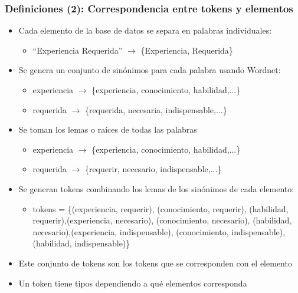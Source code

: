 \fontsize{9.5pt}{7.2}\selectfont
\begin{frame}
  \frametitle{Definiciones (2): Correspondencia entre tokens y elementos}
  \begin{itemize}
    \item Cada elemento de la base de datos se separa en palabras individuales:
    \begin{itemize}\fontsize{9.5pt}{7.2}\selectfont
      \item “Experiencia Requerida” $\rightarrow$ \{Experiencia, Requerida\}
    \end{itemize}
    \item Se genera un conjunto de sinónimos para cada palabra usando Wordnet:
    \begin{itemize}\fontsize{9.5pt}{7.2}\selectfont
      \item experiencia $\rightarrow$ \{experiencia, conocimiento, habilidad,...\}
      \item requerida $\rightarrow$ \{requerida, necesaria, indispensable,...\}
    \end{itemize}
    \item Se toman los lemas o raíces de todas las palabras
      \begin{itemize}\fontsize{9.5pt}{7.2}\selectfont
        \item experiencia $\rightarrow$ \{experiencia, conocimiento, habilidad,...\}
        \item requerida $\rightarrow$ \{requerir, necesario, indispensable,...\}
    \end{itemize}
    \item Se generan tokens combinando los lemas de los sinónimos de cada elemento:
    \begin{itemize}\fontsize{9.5pt}{7.2}\selectfont
        \item tokens = \{(experiencia, requerir), (conocimiento, requerir), (habilidad, requerir),(experiencia, necesario), (conocimiento, necesario), (habilidad, necesario),(experiencia, indispensable), (conocimiento, indispensable), (habilidad, indispensable)\}
    \end{itemize}
    \item Este conjunto de tokens son los tokens que se corresponden con el elemento
    \item Un token tiene tipos dependiendo a qué elementos corresponda
  \end{itemize}
\end{frame}

